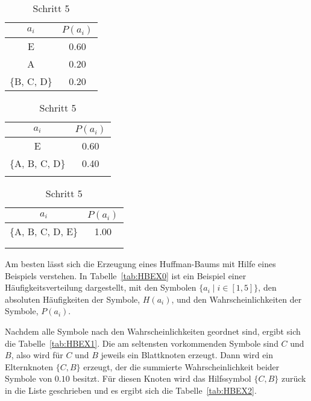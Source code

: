 \documentclass[twoside,11pt,a4paper]{article}
\theoremstyle{break}
\begin{document}
\begin{table}[h]
\begin{subtable}[t]{0.3\textwidth}
\end{subtable}
\begin{subtable}[t]{0.3\textwidth}
  \centering
  \caption{Schritt 3}
   \begin{tabular}{c|c}
    $a_i$ & $P(a_i)$ \\ \hline
    E & 0.60 \\
    A & 0.20 \\
    \{B, C, D\} & 0.20 \\
  \end{tabular}
  \label{tab:HBEX3}
\end{subtable}
\begin{subtable}[t]{0.3\textwidth}
  \centering
  \caption{Schritt 4}
   \begin{tabular}{c|c}
    $a_i$ & $P(a_i)$ \\ \hline
    E & 0.60 \\
    \{A, B, C, D\} & 0.40 \\ \\
  \end{tabular}
  \label{tab:HBEX4}
\end{subtable}
\begin{subtable}[t]{0.3\textwidth}
  \centering
  \caption{Schritt 5}
  \begin{tabular}{c|c}
    $a_i$ & $P(a_i)$ \\ \hline
    \{A, B, C, D, E\} & 1.00 \\ \\ \\
  \end{tabular}
  \label{tab:HBEX5}
\end{subtable}
\label{tab:HBEX}
\end{table}

Am besten lässt sich die Erzeugung eines Huffman-Baums mit Hilfe eines
Beispiels verstehen. In Tabelle~\ref{tab:HBEX0} ist ein Beispiel einer
Häufigkeitsverteilung dargestellt, mit den Symbolen $\{a_i \mid i \in
[1, 5]\}$, den absoluten Häufigkeiten der Symbole, $H(a_i)$, und den
Wahrscheinlichkeiten der Symbole, $P(a_i)$.

Nachdem alle Symbole nach den Wahrscheinlichkeiten geordnet sind,
ergibt sich die Tabelle~\ref{tab:HBEX1}. Die am seltensten vorkommenden
Symbole sind $C$ und $B$, also wird für $C$ und $B$ jeweils ein
Blattknoten erzeugt. Dann wird ein Elternknoten $\{C, B\}$ erzeugt,
der die summierte Wahrscheinlichkeit beider Symbole von $0.10$
besitzt. Für diesen Knoten wird das Hilfssymbol $\{C, B\}$ zurück in
die Liste geschrieben und es ergibt sich die Tabelle~\ref{tab:HBEX2}.
\end{document}
